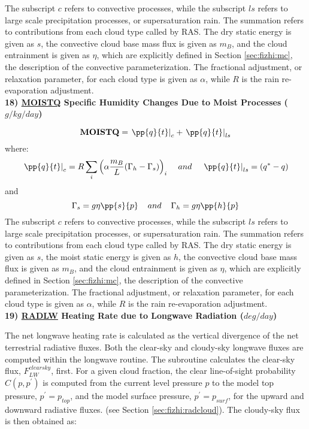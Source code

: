 \noindent
The subscript $c$ refers to convective processes, while the subscript $ls$ refers to large scale
precipitation processes, or supersaturation rain. 
The summation refers to contributions from each cloud type called by RAS.  
The dry static energy is given 
as $s$, the convective cloud base mass flux is given as $m_B$, and the cloud entrainment is
given as $\eta$, which are explicitly defined in Section \ref{sec:fizhi:mc}, 
the description of the convective parameterization.  The fractional adjustment, or relaxation
parameter, for each cloud type is given as $\alpha$, while
$R$ is the rain re-evaporation adjustment.
\\

\noindent
{\bf 18)  \underline {MOISTQ} Specific Humidity Changes Due to Moist Processes ($g/kg/day$) } 

\noindent
\[
{\bf MOISTQ} = \left. {\pp{q}{t}}\right|_{c} + \left. {\pp{q}{t}} \right|_{ls}
\]
where:
\[
\left.{\pp{q}{t}}\right|_{c} = R \sum_i \left( \alpha { m_B \over {L}}(\Gamma_h-\Gamma_s) \right)_i 
\hspace{.4cm} and 
\hspace{.4cm} \left.{\pp{q}{t}}\right|_{ls} = (q^*-q)
\]
and
\[
\Gamma_s = g \eta \pp{s}{p}\hspace{.4cm} and \hspace{.4cm}\Gamma_h = g \eta \pp{h}{p}
\]
\noindent
The subscript $c$ refers to convective processes, while the subscript $ls$ refers to large scale
precipitation processes, or supersaturation rain. 
The summation refers to contributions from each cloud type called by RAS.  
The dry static energy is given as $s$, 
the moist static energy is given as $h$, 
the convective cloud base mass flux is given as $m_B$, and the cloud entrainment is
given as $\eta$, which are explicitly defined in Section \ref{sec:fizhi:mc}, 
the description of the convective parameterization.  The fractional adjustment, or relaxation
parameter, for each cloud type is given as $\alpha$, while
$R$ is the rain re-evaporation adjustment.
\\

\noindent
{\bf 19)  \underline {RADLW} Heating Rate due to Longwave Radiation ($deg/day$) }

\noindent
The net longwave heating rate is calculated as the vertical divergence of the
net terrestrial radiative fluxes.
Both the clear-sky and cloudy-sky longwave fluxes are computed within the
longwave routine.
The subroutine calculates the clear-sky flux, $F^{clearsky}_{LW}$, first.
For a given cloud fraction,
the clear line-of-sight probability $C(p,p^{\prime})$ is computed from the current level pressure $p$ 
to the model top pressure, $p^{\prime} = p_{top}$, and the model surface pressure, $p^{\prime} = p_{surf}$,
for the upward and downward radiative fluxes.
(see Section \ref{sec:fizhi:radcloud}).
The cloudy-sky flux is then obtained as:
   
